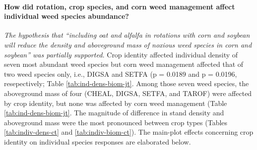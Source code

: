 \documentclass[
]{article}
\author{}
\date{\vspace{-2.5em}}
\begin{document}
\hypertarget{how-did-rotation-crop-species-and-corn-weed-management-affect-individual-weed-species-abundance}{%
\paragraph*{How did rotation, crop species, and corn weed management affect individual weed species abundance?}\label{how-did-rotation-crop-species-and-corn-weed-management-affect-individual-weed-species-abundance}}

\emph{The hypothesis that ``including oat and alfalfa in rotations with corn and soybean will reduce the density and aboveground mass of noxious weed species in corn and soybean'' was partially supported.} Crop identity affected individual density of seven most abundant weed species but corn weed management affected that of two weed species only, i.e., DIGSA and SETFA (p = 0.0189 and p = 0.0196, resepectively; Table \ref{tab:ind-dens-biom-jt}. Among those seven weed species, the aboveground mass of four (CHEAL, DIGSA, SETFA, and TAROF) were affected by crop identity, but none was affected by corn weed management (Table \ref{tab:ind-dens-biom-jt}. The magnitude of difference in stand density and aboveground mass were the most pronounced between crop types (Tables \ref{tab:indiv-dens-ct} and \ref{tab:indiv-biom-ct}). The main-plot effects concerning crop identity on individual species responses are elaborated below.
\end{document}
